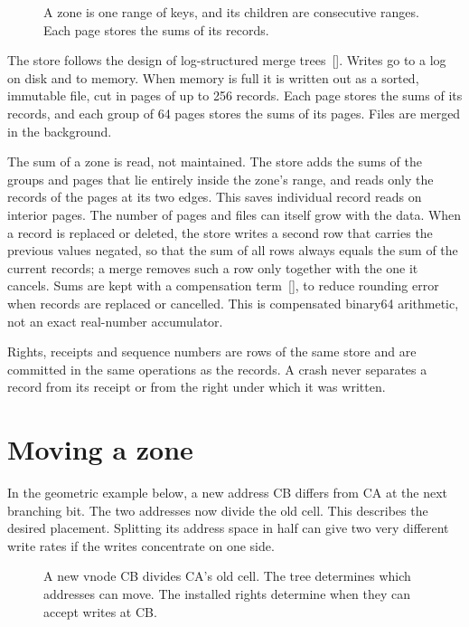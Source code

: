 \documentclass[11pt]{article}
\begin{document}
\begin{figure}[H]
    \centering
    \caption{A zone is one range of keys, and its children are consecutive ranges. Each page stores the sums of its records.}
\end{figure}

The store follows the design of log-structured merge trees~[]. Writes go to a log on disk and to memory. When memory is full it is written out as a sorted, immutable file, cut in pages of up to 256 records. Each page stores the sums of its records, and each group of 64 pages stores the sums of its pages. Files are merged in the background.

The sum of a zone is read, not maintained. The store adds the sums of the groups and pages that lie entirely inside the zone's range, and reads only the records of the pages at its two edges. This saves individual record reads on interior pages. The number of pages and files can itself grow with the data. When a record is replaced or deleted, the store writes a second row that carries the previous values negated, so that the sum of all rows always equals the sum of the current records; a merge removes such a row only together with the one it cancels. Sums are kept with a compensation term~[], to reduce rounding error when records are replaced or cancelled. This is compensated binary64 arithmetic, not an exact real-number accumulator.

Rights, receipts and sequence numbers are rows of the same store and are committed in the same operations as the records. A crash never separates a record from its receipt or from the right under which it was written.

\section{Moving a zone}\hypertarget{ix:handoff}{}
In the geometric example below, a new address CB differs from CA at the next branching bit. The two addresses now divide the old cell. This describes the desired placement. Splitting its address space in half can give two very different write rates if the writes concentrate on one side.

\begin{figure}[H]
    \centering
    \caption{A new vnode CB divides CA's old cell. The tree determines which addresses can move. The installed rights determine when they can accept writes at CB.}
\end{figure}
\end{document}

